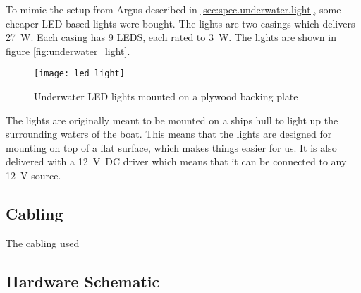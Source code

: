 To mimic the setup from Argus described in \vref{sec:spec.underwater.light}, some cheaper LED based lights were bought. The lights are two casings 
which delivers \SI{27}{\watt}. Each casing has 9 LEDS, each rated to \SI{3}{\watt}. The lights are shown in figure \vref{fig:underwater_light}.

\begin{figure}[htbp]
	\centering
	\texttt{[image: led\_light]}
	\caption{Underwater LED lights mounted on a plywood backing plate}
	\label{fig:underwater_light}
\end{figure}

The lights are originally meant to be mounted on a ships hull to light up the surrounding waters of the boat. 
This means that the lights are designed for mounting on top of a flat surface, which makes things easier for us. It 
is also delivered with a \SI{12}{\volt DC} driver which means that it can be connected to any 
\SI{12}{\volt} source.

\subsection{Cabling}
The cabling used 


\subsection{Hardware Schematic}

